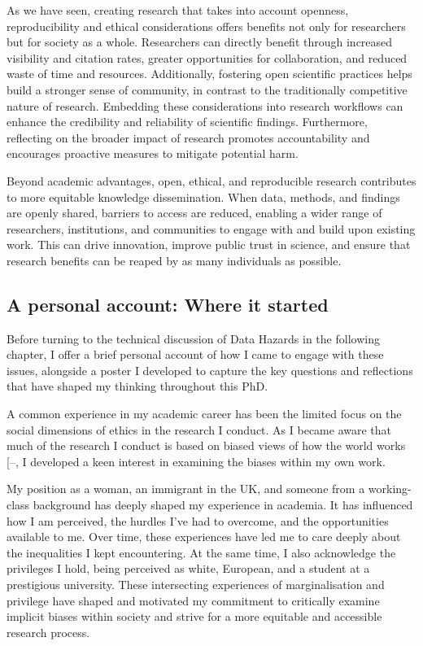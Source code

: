 \documentclass[
  11pt,
  letterpaper,
]{scrreprt}
\begin{document}
As we have seen, creating research that takes into account openness,
reproducibility and ethical considerations offers benefits not only for
researchers but for society as a whole. Researchers can directly benefit
through increased visibility and citation rates, greater opportunities
for collaboration, and reduced waste of time and resources.
Additionally, fostering open scientific practices helps build a stronger
sense of community, in contrast to the traditionally competitive nature
of research. Embedding these considerations into research workflows can
enhance the credibility and reliability of scientific findings.
Furthermore, reflecting on the broader impact of research promotes
accountability and encourages proactive measures to mitigate potential
harm.

Beyond academic advantages, open, ethical, and reproducible research
contributes to more equitable knowledge dissemination. When data,
methods, and findings are openly shared, barriers to access are reduced,
enabling a wider range of researchers, institutions, and communities to
engage with and build upon existing work. This can drive innovation,
improve public trust in science, and ensure that research benefits can
be reaped by as many individuals as possible.

\subsection{A personal account: Where it
started}\label{a-personal-account-where-it-started}

Before turning to the technical discussion of Data Hazards in the
following chapter, I offer a brief personal account of how I came to
engage with these issues, alongside a poster I developed to capture the
key questions and reflections that have shaped my thinking throughout
this PhD.

A common experience in my academic career has been the limited focus on
the social dimensions of ethics in the research I conduct. As I became
aware that much of the research I conduct is based on biased views of
how the world works
{[}--\citeproc{ref-ross2020Everyday}{424}{]},
I developed a keen interest in examining the biases within my own work.

My position as a woman, an immigrant in the UK, and someone from a
working-class background has deeply shaped my experience in academia. It
has influenced how I am perceived, the hurdles I've had to overcome, and
the opportunities available to me. Over time, these experiences have led
me to care deeply about the inequalities I kept encountering. At the
same time, I also acknowledge the privileges I hold, being perceived as
white, European, and a student at a prestigious university. These
intersecting experiences of marginalisation and privilege have shaped
and motivated my commitment to critically examine implicit biases within
society and strive for a more equitable and accessible research process.
\end{document}

